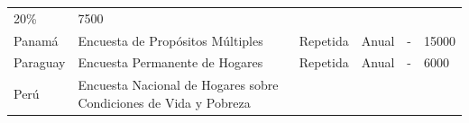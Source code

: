 \documentclass[12pt,spanish,]{book}
\begin{document}
\begin{longtable}[]{@{}llllll@{}}
\begin{minipage}[t]{0.06\columnwidth}
20\%\strut
\end{minipage} & \begin{minipage}[t]{0.13\columnwidth}\raggedright
7500\strut
\end{minipage}\tabularnewline
\begin{minipage}[t]{0.13\columnwidth}\raggedright
Panamá\strut
\end{minipage} & \begin{minipage}[t]{0.38\columnwidth}\raggedright
Encuesta de Propósitos Múltiples\strut
\end{minipage} & \begin{minipage}[t]{0.06\columnwidth}\raggedright
Repetida\strut
\end{minipage} & \begin{minipage}[t]{0.08\columnwidth}\raggedright
Anual\strut
\end{minipage} & \begin{minipage}[t]{0.06\columnwidth}\raggedright
-\strut
\end{minipage} & \begin{minipage}[t]{0.13\columnwidth}\raggedright
15000\strut
\end{minipage}\tabularnewline
\begin{minipage}[t]{0.13\columnwidth}\raggedright
Paraguay\strut
\end{minipage} & \begin{minipage}[t]{0.38\columnwidth}\raggedright
Encuesta Permanente de Hogares\strut
\end{minipage} & \begin{minipage}[t]{0.06\columnwidth}\raggedright
Repetida\strut
\end{minipage} & \begin{minipage}[t]{0.08\columnwidth}\raggedright
Anual\strut
\end{minipage} & \begin{minipage}[t]{0.06\columnwidth}\raggedright
-\strut
\end{minipage} & \begin{minipage}[t]{0.13\columnwidth}\raggedright
6000\strut
\end{minipage}\tabularnewline
\begin{minipage}[t]{0.13\columnwidth}\raggedright
Perú\strut
\end{minipage} & \begin{minipage}[t]{0.38\columnwidth}\raggedright
Encuesta Nacional de Hogares sobre Condiciones de Vida y Pobreza\strut
\end{minipage} & \begin{minipage}[t]{0.06\columnwidth}\raggedright

\end{minipage}
\end{longtable}
\end{document}
